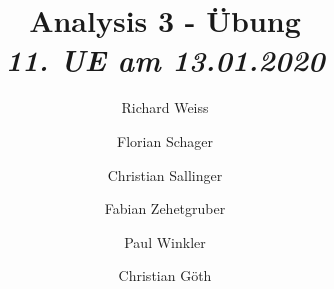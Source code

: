 \documentclass{article}
\title
{
  Analysis 3 - Übung \\
  \vspace{4pt}
  \normalsize
  \textit{11. UE am 13.01.2020}
}
\author
{
  Richard Weiss       \and
  Florian Schager     \and
  Christian Sallinger \and
  Fabian Zehetgruber  \and
  Paul Winkler        \and
  Christian Göth
}
\date{}
\begin{document}
\maketitle


\pagebreak









\end{document}
